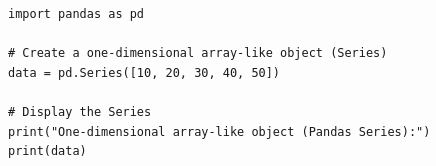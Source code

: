 \begin{verbatim}
import pandas as pd

# Create a one-dimensional array-like object (Series)
data = pd.Series([10, 20, 30, 40, 50])

# Display the Series
print("One-dimensional array-like object (Pandas Series):")
print(data)
\end{verbatim}